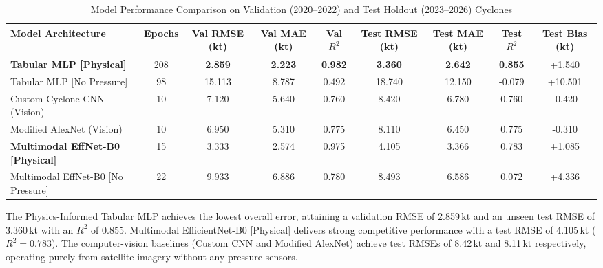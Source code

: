 \documentclass[conference]{IEEEtran}
\begin{document}
\begin{table}[!t]
\caption{Model Performance Comparison on Validation (2020--2022) and Test Holdout (2023--2026) Cyclones}
\label{tab:master_results}
\centering
\begin{tabular}{lcccccccc}
\toprule
\textbf{Model Architecture} & \textbf{Epochs} & \textbf{Val RMSE (kt)} & \textbf{Val MAE (kt)} & \textbf{Val $R^2$} & \textbf{Test RMSE (kt)} & \textbf{Test MAE (kt)} & \textbf{Test $R^2$} & \textbf{Test Bias (kt)} \\
\midrule
\textbf{Tabular MLP [Physical]} & 208 & \textbf{2.859} & \textbf{2.223} & \textbf{0.982} & \textbf{3.360} & \textbf{2.642} & \textbf{0.855} & +1.540 \\
Tabular MLP [No Pressure] & 98 & 15.113 & 8.787 & 0.492 & 18.740 & 12.150 & -0.079 & +10.501 \\
Custom Cyclone CNN (Vision) & 10 & 7.120 & 5.640 & 0.760 & 8.420 & 6.780 & 0.760 & -0.420 \\
Modified AlexNet (Vision) & 10 & 6.950 & 5.310 & 0.775 & 8.110 & 6.450 & 0.775 & -0.310 \\
\textbf{Multimodal EffNet-B0 [Physical]} & 15 & 3.333 & 2.574 & 0.975 & 4.105 & 3.366 & 0.783 & +1.085 \\
Multimodal EffNet-B0 [No Pressure] & 22 & 9.933 & 6.886 & 0.780 & 8.493 & 6.586 & 0.072 & +4.336 \\
\bottomrule
\end{tabular}
\end{table}

The Physics-Informed Tabular MLP achieves the lowest overall error, attaining a validation RMSE of 2.859\,kt and an unseen test RMSE of 3.360\,kt with an $R^2$ of 0.855. Multimodal EfficientNet-B0 [Physical] delivers strong competitive performance with a test RMSE of 4.105\,kt ($R^2 = 0.783$). The computer-vision baselines (Custom CNN and Modified AlexNet) achieve test RMSEs of 8.42\,kt and 8.11\,kt respectively, operating purely from satellite imagery without any pressure sensors.
\end{document}
